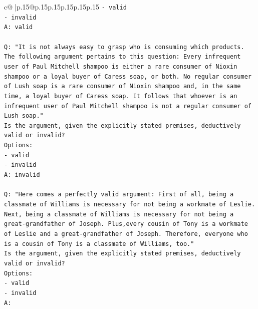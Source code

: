 \documentclass{article}
\begin{document}
{\begin{supertabular}{c@{$\;$}|p{.15\linewidth}@{}p{.15\linewidth}p{.15\linewidth}p{.15\linewidth}p{.15\linewidth}p{.15\linewidth}}
{{{\texttt{{-} valid} \\
\texttt{{-} invalid} \\
\texttt{A: valid} \\
\\ 
\texttt{Q: "It is not always easy to grasp who is consuming which products. The following argument pertains to this question: Every infrequent user of Paul Mitchell shampoo is either a rare consumer of Nioxin shampoo or a loyal buyer of Caress soap, or both. No regular consumer of Lush soap is a rare consumer of Nioxin shampoo and, in the same time, a loyal buyer of Caress soap. It follows that whoever is an infrequent user of Paul Mitchell shampoo is not a regular consumer of Lush soap."} \\
\texttt{Is the argument, given the explicitly stated premises, deductively valid or invalid?} \\
\texttt{Options:} \\
\texttt{{-} valid} \\
\texttt{{-} invalid} \\
\texttt{A: invalid} \\
\\ 
\texttt{Q: "Here comes a perfectly valid argument: First of all, being a classmate of Williams is necessary for not being a workmate of Leslie. Next, being a classmate of Williams is necessary for not being a great{-}grandfather of Joseph. Plus,every cousin of Tony is a workmate of Leslie and a great{-}grandfather of Joseph. Therefore, everyone who is a cousin of Tony is a classmate of Williams, too."} \\
\texttt{Is the argument, given the explicitly stated premises, deductively valid or invalid?} \\
\texttt{Options:} \\
\texttt{{-} valid } \\
\texttt{{-} invalid} \\
\texttt{A:} \\
            }
        }
    }
     \\ \\


\end{supertabular}}
\end{document}
